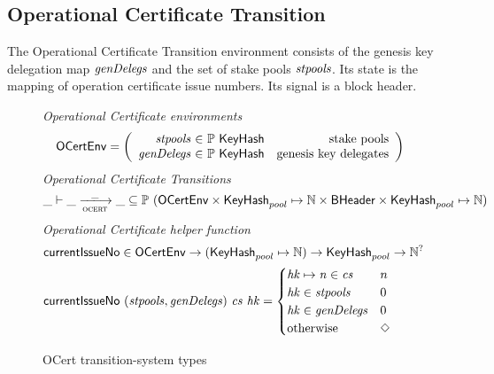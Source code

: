 \clearpage

\subsection{Operational Certificate Transition}
\label{sec:oper-cert-trans}

The Operational Certificate Transition environment consists of the genesis key
delegation map $\mathit{genDelegs}$ and the set of stake pools $\mathit{stpools}$. Its state
is the mapping of operation certificate issue numbers.  Its signal is a block
header.

\begin{figure}
  \emph{Operational Certificate environments}
  \begin{equation*}
    \OCertEnv =
    \left(
      \begin{array}{r@{~\in~}lr}
        \var{stpools} & \powerset{\type{KeyHash}} & \text{stake pools} \\
        \var{genDelegs} & \powerset{\type{KeyHash}} & \text{genesis key delegates}\\
      \end{array}
    \right)
  \end{equation*}
  \emph{Operational Certificate Transitions}
  \begin{equation*}
    \var{\_} \vdash \var{\_} \trans{ocert}{\_} \var{\_} \subseteq
    \powerset (\OCertEnv \times \KeyHash_{pool} \mapsto \N \times \BHeader \times \KeyHash_{pool} \mapsto \N)
  \end{equation*}
  \emph{Operational Certificate helper function}
  \begin{align*}
      & \mathsf{currentIssueNo} \in \mathsf{OCertEnv} \to (\mathsf{KeyHash}_{pool} \mapsto \mathbb{N})
                                           \to \mathsf{KeyHash}_{pool}
                                           \to \mathbb{N}^? \\
      & \mathsf{currentIssueNo}~(\mathit{stpools}, \mathit{genDelegs})~ \mathit{cs} ~\mathit{hk} =
      \begin{cases}
        \mathit{hk}\mapsto \mathit{n} \in \mathit{cs} & n \\
        \mathit{hk} \in \mathit{stpools} & 0 \\
        \mathit{hk} \in \mathit{genDelegs} & 0 \\
        \text{otherwise} & \Diamond
      \end{cases}
  \end{align*}
  \caption{OCert transition-system types}
  \label{fig:ts-types:ocert}
\end{figure}

